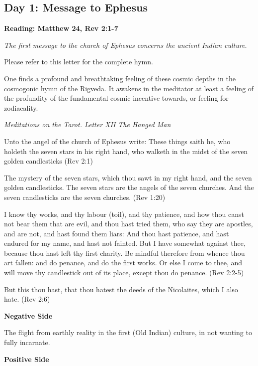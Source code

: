 \subsection*{Day 1: Message to Ephesus}
\textbf{Reading: Matthew 24, Rev 2:1-7}

\emph{The first message to the church of Ephesus concerns the ancient Indian culture.}

Please refer to this letter for the complete hymn.

\begin{quotationx}
One finds a profound and breathtaking feeling of these cosmic depths in the cosmogonic hymn of the Rigveda. It awakens
in the meditator at least a feeling of the profundity of the fundamental cosmic incentive towards, or feeling for
zodiacality. \begin{flushright} \emph{Meditations on the Tarot. Letter XII The Hanged Man}\end{flushright}

\end{quotationx}

Unto the angel of the church of Ephesus write: These things saith he, who holdeth the seven stars in his right hand, who
walketh in the midst of the seven golden candlesticks (Rev 2:1)

The mystery of the seven stars, which thou sawt in my right hand, and the seven golden candlesticks. The seven stars are
the angels of the seven churches. And the seven candlesticks are the seven churches. (Rev 1:20)

I know thy works, and thy labour (toil), and thy patience, and how thou canst not bear them that are evil, and thou hast
tried them, who say they are apostles, and are not, and hast found them liars: And thou hast patience, and hast endured
for my name, and hast not fainted. But I have somewhat against thee, because thou hast left thy first charity. Be
mindful therefore from whence thou art fallen: and do penance, and do the first works. Or else I come to thee, and will
move thy candlestick out of its place, except thou do penance. (Rev 2:2-5)

But this thou hast, that thou hatest the deeds of the Nicolaites, which I also hate. (Rev 2:6)

\textbf{Negative Side}

The flight from earthly reality in the first (Old Indian) culture, in not wanting to fully incarnate.

\textbf{Positive Side}


